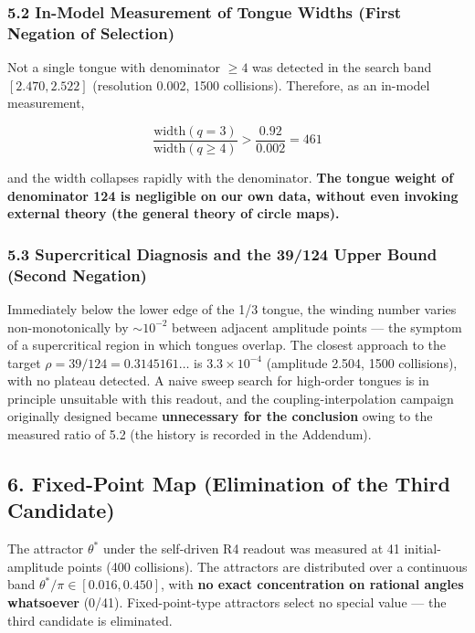 \documentclass[
  a4paper,
]{article}
\begin{document}
\subsubsection{5.2 In-Model Measurement of Tongue Widths (First Negation
of
Selection)}\label{in-model-measurement-of-tongue-widths-first-negation-of-selection}

Not a single tongue with denominator \(\ge4\) was detected in the search
band \([2.470, 2.522]\) (resolution 0.002, 1500 collisions). Therefore,
as an in-model measurement,

\[
\frac{\mathrm{width}(q=3)}{\mathrm{width}(q\ge4)}>\frac{0.92}{0.002}=461
\]

and the width collapses rapidly with the denominator. \textbf{The tongue
weight of denominator 124 is negligible on our own data, without even
invoking external theory (the general theory of circle maps).}

\subsubsection{5.3 Supercritical Diagnosis and the 39/124 Upper Bound
(Second
Negation)}\label{supercritical-diagnosis-and-the-39124-upper-bound-second-negation}

Immediately below the lower edge of the 1/3 tongue, the winding number
varies non-monotonically by \(\sim10^{-2}\) between adjacent amplitude
points --- the symptom of a supercritical region in which tongues
overlap. The closest approach to the target
\(\rho=39/124=0.3145161\ldots\) is \(3.3\times10^{-4}\) (amplitude
2.504, 1500 collisions), with no plateau detected. A naive sweep search
for high-order tongues is in principle unsuitable with this readout, and
the coupling-interpolation campaign originally designed became
\textbf{unnecessary for the conclusion} owing to the measured ratio of
5.2 (the history is recorded in the Addendum).

\subsection{6. Fixed-Point Map (Elimination of the Third
Candidate)}\label{fixed-point-map-elimination-of-the-third-candidate}

The attractor \(\theta^*\) under the self-driven R4 readout was measured
at 41 initial-amplitude points (400 collisions). The attractors are
distributed over a continuous band \(\theta^*/\pi\in[0.016, 0.450]\),
with \textbf{no exact concentration on rational angles whatsoever}
(0/41). Fixed-point-type attractors select no special value --- the
third candidate is eliminated.
\end{document}
